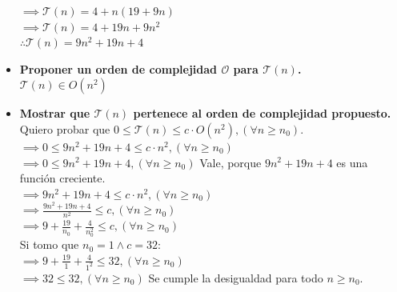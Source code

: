 \documentclass[12 pt]{article}
\begin{document}
\begin{itemize}
            \(\implies \mathcal{T}(n) = 4 + n(19 + 9n)\) \\
            \(\implies \mathcal{T}(n) = 4 + 19n + 9n^{2}\) \\
            \(\therefore \mathcal{T}(n) = 9n^{2}+19n+4\) \\
        \item \textbf{Proponer un orden de complejidad $\mathcal{O}$ para $\mathcal{T}(n)$.} \\
            \(\mathcal{T}(n) \in O(n^{2})\)
        \item \textbf{Mostrar que $\mathcal{T}(n)$ pertenece al orden de complejidad propuesto.} \\
            Quiero probar que \(0 \leq \mathcal{T}(n) \leq c \cdot O(n^{2}), (\forall n \geq n_{0})\). \\
            \(\implies 0 \leq 9n^{2}+19n+4 \leq c \cdot n^{2}, (\forall n \geq n_{0})\) \\
            \(\implies 0 \leq 9n^{2}+19n+4, (\forall n \geq n_{0})\) Vale, porque $9n^{2}+19n+4$ es una función creciente. \\
            \(\implies 9n^{2}+19n+4 \leq c \cdot n^{2}, (\forall n \geq n_{0})\) \\
            \(\implies \frac{9n^{2}+19n+4}{n^{2}} \leq c, (\forall n \geq n_{0})\) \\
            \(\implies 9+\frac{19}{n_{0}}+\frac{4}{n_{0}^{2}} \leq c, (\forall n \geq n_{0})\) \\
            Si tomo que \(n_{0} = 1 \wedge c = 32\): \\
            \(\implies 9+\frac{19}{1}+\frac{4}{1^{2}} \leq 32, (\forall n \geq n_{0})\) \\
            \(\implies 32 \leq 32, (\forall n \geq n_{0})\) Se cumple la desigualdad para todo $n \geq n_{0}$. \\
            \begin{center}
\end{center}
\end{itemize}
\end{document}
